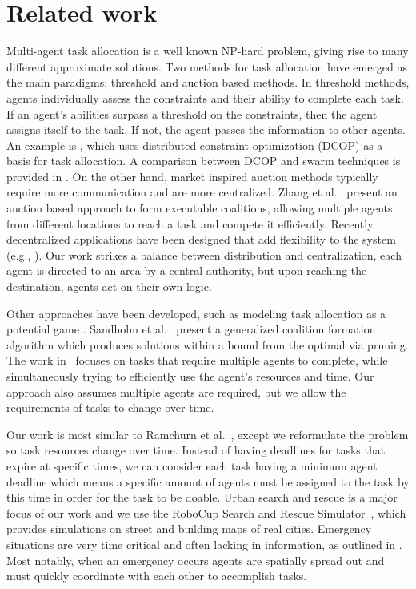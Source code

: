 \documentclass[11pt]{article}
\begin{document}
\section{Related work} 
\label{sec:rw}
Multi-agent task allocation is a well known NP-hard problem,
giving rise to many different approximate solutions.
Two methods for task allocation have emerged 
as the main paradigms: threshold and auction based methods.
In threshold methods, agents individually assess the constraints and their 
ability to complete each task.  If an agent's abilities surpass a threshold 
on the constraints, then the agent assigns itself to the task.  
If not, the agent passes the information to other agents.  
An example is \cite{Scer-Fari-05}, 
which uses distributed constraint optimization (DCOP) as a basis for 
task allocation.
A comparison between DCOP and swarm techniques is provided in 
\cite{Ferreira2010}.  
On the other hand, 
market inspired auction methods typically require more
communication and are more centralized.  
Zhang et al.~\cite{Zhang2012} present an auction based 
approach to form executable coalitions,
allowing multiple agents from different locations 
to reach a task and compete it efficiently.  
Recently, decentralized applications have been designed that add flexibility 
to the system (e.g., \cite{Nanjanath10}).
Our work strikes a balance between distribution and centralization, each agent is
directed to an area by a central authority, but upon reaching the destination,
agents act on their own logic.

Other approaches have been developed, such as 
modeling task allocation as a potential game
\cite{Chapman2010}.
Sandholm et al.~\cite{Sandholm99} present a generalized coalition formation 
algorithm which produces solutions within a bound from the optimal via 
pruning.
The work in~\cite{Zheng08} focuses on tasks that require 
multiple agents to complete,
while simultaneously trying to efficiently use 
the agent's resources and time.
Our approach also assumes multiple agents are required, but we allow
the requirements of tasks to change over time.

Our work is most similar to Ramchurn et al.~\cite{Ramchurn10},
except we reformulate the problem so task resources change over time.
Instead of having deadlines for tasks that expire at specific times,
we can consider each task having a minimum agent deadline which
means a specific amount of agents must be assigned to the task
by this time in order for the task to be doable.
Urban search and rescue is a major focus of our work and we use the
RoboCup Search and Rescue Simulator~\cite{Kitano01}, which provides
simulations on street and building maps of real cities.
Emergency situations are very time critical and often lacking
in information, as outlined in \cite{Monares11}.  
Most notably, when an emergency occurs agents are spatially
spread out and must quickly
coordinate with each other to accomplish tasks.




\end{document}
